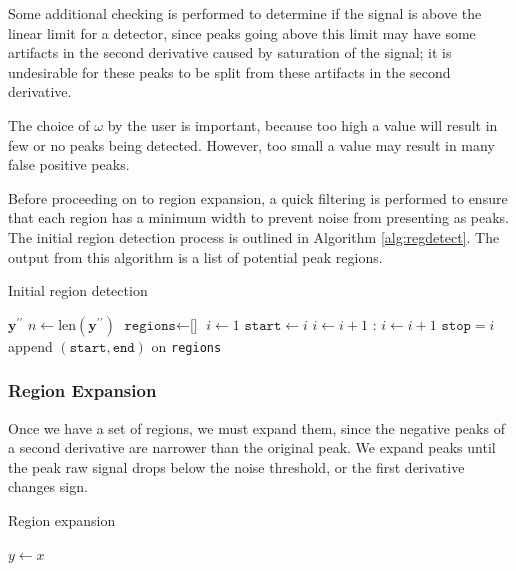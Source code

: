 \documentclass{article}
\begin{document}
Some additional checking is performed to determine if the signal is above the linear limit for a detector, since peaks going above this limit may have some artifacts in the second derivative caused by saturation of the signal; it is undesirable for these peaks to be split from these artifacts in the second derivative.

The choice of $\omega$ by the user is important, because too high a value will result in few or no peaks being detected. However, too small a value may result in many false positive peaks.

Before proceeding on to region expansion, a quick filtering is performed to ensure that each region has a minimum width to prevent noise from presenting as peaks. The initial region detection process is outlined in Algorithm \ref{alg:regdetect}. The output from this algorithm is a list of potential peak regions.

\begin{algorithm}[t]
\caption{Initial region detection}\label{alg:regdetect}
\begin{algorithmic}
\Require $\mathbf{y}^{\prime\prime}$ 
\State $n \gets \text{len}(\mathbf{y}^{\prime\prime})$
\State $\texttt{regions} \gets \texttt{[]}$
\State $i \gets 1$
    \State $\texttt{start} \gets i$
    \State $i \gets i+1$
    :
      \State $i \gets i+1$
    \EndWhile
    \State $\texttt{stop} = i$
  	  \State append $(\texttt{start}, \texttt{end})$ on \texttt{regions}
    \EndIf
  \EndIf
\EndWhile
\end{algorithmic}
\end{algorithm}



\subsubsection{Region Expansion}

Once we have a set of regions, we must expand them, since the negative peaks of a second derivative are narrower than the original peak. We expand peaks until the peak raw signal drops below the noise threshold, or the first derivative changes sign. 



\begin{algorithm}[t]
\caption{Region expansion}\label{alg:regexp}
\begin{algorithmic}
\State $y \gets x$
\end{algorithmic}
\end{algorithm}
\end{document}
